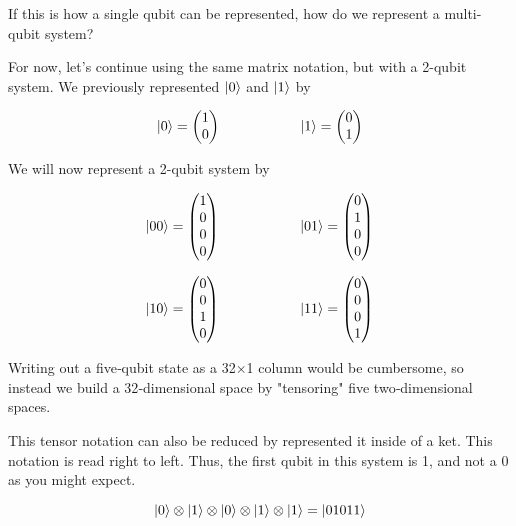 \documentclass[12pt]{article}
\begin{document}
If this is how a single qubit can be represented, how do we represent a multi-qubit system? 

For now, let's continue using the same matrix notation, but with a 2-qubit system. We previously represented $\ket{0}$ and $\ket{1}$ by

$$
\ket{0} = \begin{pmatrix} 1 \\ 0 \end{pmatrix}
\hspace{2cm}
\ket{1} = \begin{pmatrix} 0 \\ 1 \end{pmatrix}
$$

We will now represent a 2-qubit system by

$$
\ket{00} = \begin{pmatrix} 1 \\ 0 \\ 0 \\ 0 \end{pmatrix}
\hspace{2cm}
\ket{01} = \begin{pmatrix} 0 \\ 1 \\ 0 \\ 0 \end{pmatrix}
$$

$$
\ket{10} = \begin{pmatrix} 0 \\ 0 \\ 1 \\ 0 \end{pmatrix}
\hspace{2cm}
\ket{11} = \begin{pmatrix} 0 \\ 0 \\ 0 \\ 1 \end{pmatrix}
$$

Writing out a five‐qubit state as a 32×1 column would be cumbersome, so instead we build a 32‐dimensional space by "tensoring" five two‐dimensional spaces.

This tensor notation can also be reduced by represented it inside of a ket. This notation is read right to left. Thus, the first qubit in this system is 1, and not a 0 as you might expect.

$$
\ket{0} \otimes \ket{1} \otimes \ket{0} \otimes \ket{1} \otimes \ket{1} = \ket{01011}
$$
\end{document}
